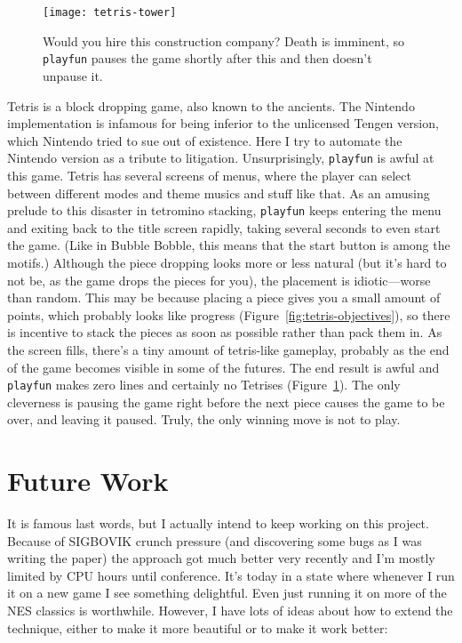 \documentclass[twocolumn]{article}
\begin{document}
\begin{figure}[ht]
\begin{center}
\texttt{[image: tetris-tower]}
\end{center}\vspace{-0.1in}
\caption{Would you hire this construction company? Death is imminent,
so {\tt playfun} pauses the game shortly after this and then doesn't
unpause it.}
\label{fig:tetris-tower}
\end{figure}

Tetris is a block dropping game, also known to the ancients. The
Nintendo implementation is infamous for being inferior to the
unlicensed Tengen version, which Nintendo tried to sue out of
existence. Here I try to automate the Nintendo version as a tribute to
litigation. Unsurprisingly, {\tt playfun} is awful at this game.
Tetris has several screens of menus, where the player can select
between different modes and theme musics and stuff like that. As an
amusing prelude to this disaster in tetromino stacking, {\tt playfun}
keeps entering the menu and exiting back to the title screen rapidly,
taking several seconds to even start the game. (Like in Bubble Bobble,
this means that the start button is among the motifs.) Although the
piece dropping looks more or less natural (but it's hard to not be, as
the game drops the pieces for you), the placement is idiotic---worse
than random. This may be because placing a piece gives you a small
amount of points, which probably looks like progress
(Figure~\ref{fig:tetris-objectives}), so there is incentive to stack
the pieces as soon as possible rather than pack them in. As the screen
fills, there's a tiny amount of tetris-like gameplay, probably as the
end of the game becomes visible in some of the futures. The end result
is awful and {\tt playfun} makes zero lines and certainly no Tetrises
(Figure~\ref{fig:tetris-tower}). The only cleverness is pausing the
game right before the next piece causes the game to be over, and
leaving it paused. Truly, the only winning move is not to play.

\section{Future Work}

It is famous last words, but I actually intend to keep working on this
project. Because of SIGBOVIK crunch pressure (and discovering some
bugs as I was writing the paper) the approach got much better very
recently and I'm mostly limited by CPU hours until conference. It's
today in a state where whenever I run it on a new game I see something
delightful. Even just running it on more of the NES classics is
worthwhile. However, I have lots of ideas about how to extend the
technique, either to make it more beautiful or to make it work better:
\end{document}
